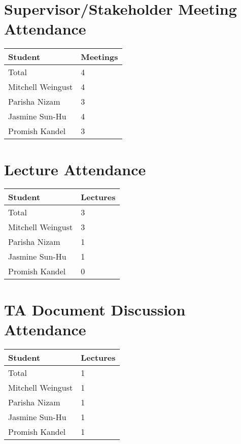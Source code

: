 \documentclass{article}
\begin{document}
\section{Supervisor/Stakeholder Meeting Attendance}

\begin{table}[H]
\centering
\begin{tabular}{ll}
\toprule
\textbf{Student} & \textbf{Meetings}\\
\midrule
Total & 4\\
Mitchell Weingust & 4\\
Parisha Nizam & 3\\
Jasmine Sun-Hu & 4\\
Promish Kandel & 3\\
\bottomrule
\end{tabular}
\end{table}


\section{Lecture Attendance}

\begin{table}[H]
\centering
\begin{tabular}{ll}
\toprule
\textbf{Student} & \textbf{Lectures}\\
\midrule
Total & 3\\
Mitchell Weingust & 3\\
Parisha Nizam & 1\\
Jasmine Sun-Hu & 1\\
Promish Kandel & 0\\
\bottomrule
\end{tabular}
\end{table}


\section{TA Document Discussion Attendance}

\begin{table}[H]
\centering
\begin{tabular}{ll}
\toprule
\textbf{Student} & \textbf{Lectures}\\
\midrule
Total & 1\\
Mitchell Weingust & 1\\
Parisha Nizam & 1\\
Jasmine Sun-Hu & 1\\
Promish Kandel & 1\\
\bottomrule
\end{tabular}
\end{table}
\end{document}
